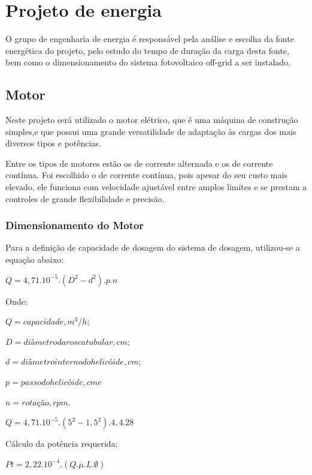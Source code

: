 \section{Projeto de energia}

O grupo de engenharia de energia é responsável pela análise e escolha da fonte energética do projeto, pelo estudo do tempo de duração da carga desta fonte, bem como o dimensionamento do sistema fotovoltaico off-grid a ser instalado.

\subsection{Motor}
Neste projeto será utilizado o motor elétrico, que é uma máquina de construção simples,e que possui uma grande versatilidade de adaptação às cargas dos mais diversos tipos e potências.

Entre os tipos de motores estão os de corrente alternada e os de corrente contínua. Foi escolhido o de corrente contínua, pois apesar do seu custo mais elevado, ele funciona com velocidade ajustável entre amplos limites e se prestam a controles de grande flexibilidade e precisão.

\subsubsection{Dimensionamento do Motor}

Para a definição de capacidade de dosagem do sistema de dosagem, utilizou-se a equação abaixo:

\begin{center}
$Q=4,71.10^{-5}.(D^{2}-d^{2}).p.n$
\end{center}

Onde:

$Q = capacidade, m^3/h;$

$D = diâmetro da rosca tubular, cm;$

$d = diâmetro interno do helicóide, cm;$

$p = passo do helicóide, cm e$

$n = rotação, rpm.$

\begin{center}
$Q=4,71.10^{-5}.(5^{2}-1,5^{2}).4,4.28$
\end{center}

Cálculo da potência requerida:

\begin{center}
$Pt = 2,22.10^{-4}.(Q.\mu.L.\emptyset)$
\end{center}

